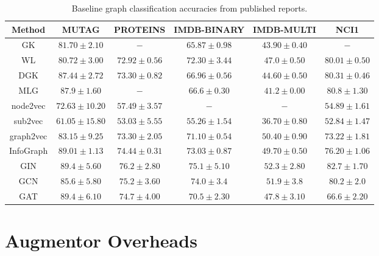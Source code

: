 \documentclass{article}
\theoremstyle{plain}
\theoremstyle{definition}
\theoremstyle{remark}
\begin{document}
\begin{table*}[ht!]
\centering
\caption{Baseline graph classification accuracies from published reports. }
\label{table:graph_baselines}
\vskip 0.15in
\begin{center}
\begin{small}
\begin{sc}
\begin{tabular}{c|c|c|c|c|c}
\toprule
Method & MUTAG & PROTEINS & IMDB-BINARY & IMDB-MULTI & NCI1 \\
\midrule
GK & $81.70 \pm 2.10$ & $-$ & $65.87 \pm 0.98$ & $43.90 \pm 0.40$ & $-$ \\
WL & $80.72 \pm 3.00$ & $72.92 \pm 0.56$ & $72.30 \pm 3.44$ & $47.0 \pm 0.50$ & $80.01 \pm 0.50$ \\
DGK  & $87.44 \pm 2.72$ & $73.30 \pm 0.82$ & $66.96 \pm 0.56$ & $44.60 \pm 0.50$ & $80.31 \pm 0.46$\\
MLG & $87.9 \pm 1.60$ & $-$ & $66.6 \pm 0.30$ & $41.2 \pm 0.00$ & $80.8 \pm 1.30$ \\
\midrule
node2vec  & $72.63 \pm 10.20$ & $57.49 \pm 3.57$ & $-$ & $-$ & $54.89 \pm 1.61$ \\
sub2vec & $61.05 \pm 15.80$ & $53.03 \pm 5.55$ & $55.26 \pm 1.54$ & $36.70 \pm 0.80$ & $52.84 \pm 1.47$ \\
graph2vec  & $83.15 \pm 9.25$ & $73.30 \pm 2.05$ & $71.10 \pm 0.54$ & $ 50.40 \pm 0.90$ & $73.22 \pm 1.81$ \\
InfoGraph & $89.01 \pm 1.13$ & $74.44 \pm 0.31$ & $73.03 \pm 0.87$ & $49.70 \pm 0.50$ & $76.20 \pm 1.06$ \\
\midrule
GIN & $89.4 \pm 5.60$ & $76.2 \pm 2.80$ & $ 75.1 \pm 5.10$ & $52.3 \pm 2.80$ & $ 82.7 \pm 1.70$ \\
GCN & $85.6 \pm 5.80$ & $75.2 \pm 3.60$ & $74.0 \pm 3.4$ & $51.9 \pm 3.8$ & $80.2 \pm 2.0$ \\
GAT & $89.4 \pm 6.10$ & $ 74.7 \pm 4.00$ & $70.5 \pm 2.30$ & $47.8 \pm 3.10$ & $66.6 \pm 2.20$ \\
\bottomrule
\end{tabular}
\end{sc}
\end{small}
\end{center}
\vskip -0.1in
\end{table*}


\section{Augmentor Overheads}
\label{appendix:aug_overhead}
\end{document}
